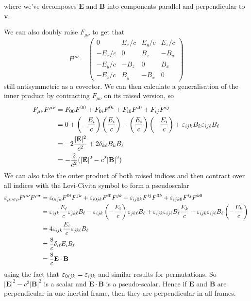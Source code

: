 \documentclass{article}
\begin{document}
where we've decomposes $ \mathbf E $ and $ \mathbf B $ into components parallel and perpendicular to $ \mathbf v $.\par
We can also doubly raise $ F_{\mu\nu} $ to get that
\[
	F^{\mu\nu} = \begin{pmatrix}
	   0 & E_x/c & E_y/c & E_z/c \\
	   -E_x/c & 0 & B_z & -B_y \\
	   -E_y/c & -B_z & 0 & B_x \\
	   -E_z/c & B_y & -B_x & 0
	\end{pmatrix}
\]
still antisymmetric as a covector. We can then calculate a generalisation of the inner product by contracting $ F_{\mu\nu} $ on its raised version, so
\begin{align*}
	F_{\mu\nu}F^{\mu\nu} &= F_{00}F^{00} + F_{0i}F^{0i} + F_{i0}F^{i0} + F_{ij}F^{ij} \\
			     &= 0 + \left(-\frac{E_i}c\right)\left(\frac{E_i}c\right) + \left(\frac{E_i}c\right)\left(-\frac{E_i}c\right) + \varepsilon_{ijk}B_k\varepsilon_{ij\ell}B_\ell \\
			     &= -2\frac{|\mathbf E|^2}{c^2} + 2\delta_{k\ell} B_kB_\ell \\
			     &= -\frac2{c^2}(|\mathbf E|^2 - c^2|\mathbf B|^2)
\end{align*}
We can also take the outer product of both raised indices and then contract over all indices with the Levi-Civita symbol to form a pseudoscalar
\begin{align*}
	\varepsilon_{\mu\nu \sigma\rho}F^{\mu\nu}F^{\rho\sigma} &= \varepsilon_{0ijk}F^{0i}F^{jk} + \varepsilon_{i0jk} F^{i0}F^{jk} + \varepsilon_{ij0k}F^{ij}F^{0k} + \varepsilon_{ijk0}F^{ij}F^{k0} \\
							&= \varepsilon_{ijk} \frac{E_i}c \varepsilon_{jk\ell} B_\ell - \varepsilon_{ijk}\left(-\frac {E_i}c\right) \varepsilon_{jk\ell}B_\ell + \varepsilon_{ijk}\varepsilon_{ij\ell}B_\ell\frac{E_k}c - \varepsilon_{ijk}\varepsilon_{ij\ell} B_\ell\left(-\frac{E_k}c\right) \\
							&= 4 \varepsilon_{ijk} \frac{E_i}c \varepsilon_{jk\ell}B_\ell \\
							&= \frac 8c \delta_{i\ell} E_iB_\ell \\
							&= \frac 8c \mathbf E \cdot \mathbf B
\end{align*}
using the fact that $ \varepsilon_{0ijk} = \varepsilon_{ijk} $ and similar results for permutations. So $ |\mathbf E|^2 - c^2 |\mathbf B|^2 $ is a scalar and $ \mathbf E \cdot\mathbf B $ is a pseudo-scalar. Hence if $ \mathbf E $ and $ \mathbf B $ are perpendicular in one inertial frame, then they are perpendicular in all frames.
\end{document}
